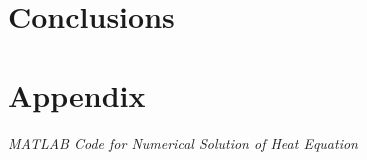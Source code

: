 \documentclass[10pt, letter, showtrims]{extarticle}
\begin{document}
		\section{Conclusions}
		
		\pagebreak	
	
	\section{Appendix}
	
	\centerline{\textit{MATLAB Code for Numerical Solution of Heat Equation}}
	
	
	
	\pagebreak
	
	
	
\end{document}
